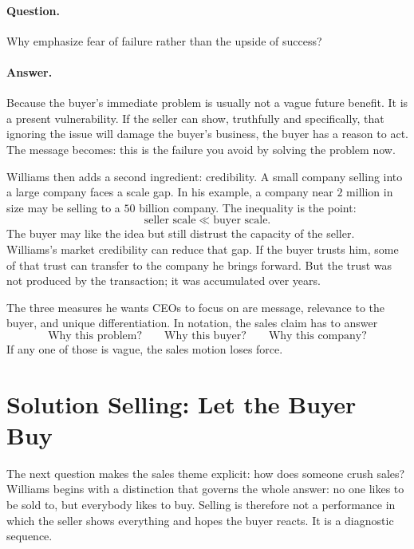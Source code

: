 \paragraph{Question.}
Why emphasize fear of failure rather than the upside of success?

\paragraph{Answer.}
Because the buyer's immediate problem is usually not a vague future benefit. It is a present vulnerability. If the seller can show, truthfully and specifically, that ignoring the issue will damage the buyer's business, the buyer has a reason to act. The message becomes: this is the failure you avoid by solving the problem now.

Williams then adds a second ingredient: credibility. A small company selling into a large company faces a scale gap. In his example, a company near $2$ million in size may be selling to a $50$ billion company. The inequality is the point:
\begin{equation}
\text{seller scale} \ll \text{buyer scale}.
\end{equation}
The buyer may like the idea but still distrust the capacity of the seller. Williams's market credibility can reduce that gap. If the buyer trusts him, some of that trust can transfer to the company he brings forward. But the trust was not produced by the transaction; it was accumulated over years.

The three measures he wants CEOs to focus on are message, relevance to the buyer, and unique differentiation. In notation, the sales claim has to answer
\begin{equation}
\text{Why this problem?}
\qquad
\text{Why this buyer?}
\qquad
\text{Why this company?}
\end{equation}
If any one of those is vague, the sales motion loses force.

\section{Solution Selling: Let the Buyer Buy}

The next question makes the sales theme explicit: how does someone crush sales? Williams begins with a distinction that governs the whole answer: no one likes to be sold to, but everybody likes to buy. Selling is therefore not a performance in which the seller shows everything and hopes the buyer reacts. It is a diagnostic sequence.

